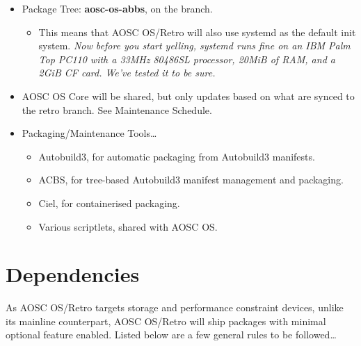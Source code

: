 \documentclass[a5paper,twosided,11pt]{book}
\begin{document}
    \begin{itemize}
    \item Package Tree: \textbf{aosc-os-abbs}, on the  branch.
        \begin{itemize}
            \item This means that AOSC OS/Retro will also use systemd as the default init system.
                {\itshape Now before you start yelling, systemd runs fine on an IBM Palm Top PC110
                with a 33MHz 80486SL processor, 20MiB of RAM, and a 2GiB CF card. We've tested it to be sure.}
        \end{itemize}
    \item AOSC OS Core will be shared, but only updates based on what are synced to the retro branch. See Maintenance Schedule.
    \item Packaging/Maintenance Tools\ldots
        \begin{itemize}
            \item Autobuild3, for automatic packaging from Autobuild3 manifests.
            \item ACBS, for tree-based Autobuild3 manifest management and packaging.
            \item Ciel, for containerised packaging.
            \item Various scriptlets, shared with AOSC OS.
        \end{itemize}
    \end{itemize}
    

    \section{Dependencies}

    As AOSC OS/Retro targets storage and performance constraint devices, unlike its mainline counterpart,
    AOSC OS/Retro will ship packages with minimal optional feature enabled.
    Listed below are a few general rules to be followed\ldots
\end{document}
